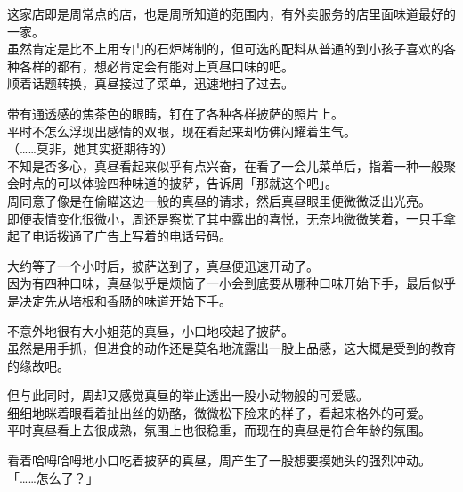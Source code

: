 这家店即是周常点的店，也是周所知道的范围内，有外卖服务的店里面味道最好的一家。\\

虽然肯定是比不上用专门的石炉烤制的，但可选的配料从普通的到小孩子喜欢的各种各样的都有，想必肯定会有能对上真昼口味的吧。\\

顺着话题转换，真昼接过了菜单，迅速地扫了过去。

带有通透感的焦茶色的眼睛，钉在了各种各样披萨的照片上。\\

平时不怎么浮现出感情的双眼，现在看起来却仿佛闪耀着生气。\\

（……莫非，她其实挺期待的）\\

不知是否多心，真昼看起来似乎有点兴奋，在看了一会儿菜单后，指着一种一般聚会时点的可以体验四种味道的披萨，告诉周「那就这个吧」。\\

周同意了像是在偷瞄这边一般的真昼的请求，然后真昼眼里便微微泛出光亮。\\

即便表情变化很微小，周还是察觉了其中露出的喜悦，无奈地微微笑着，一只手拿起了电话拨通了广告上写着的电话号码。\\

\vspace{2\baselineskip}

大约等了一个小时后，披萨送到了，真昼便迅速开动了。\\

因为有四种口味，真昼似乎是烦恼了一小会到底要从哪种口味开始下手，最后似乎是决定先从培根和香肠的味道开始下手。

不意外地很有大小姐范的真昼，小口地咬起了披萨。\\

虽然是用手抓，但进食的动作还是莫名地流露出一股上品感，这大概是受到的教育的缘故吧。

但与此同时，周却又感觉真昼的举止透出一股小动物般的可爱感。\\

细细地眯着眼看着扯出丝的奶酪，微微松下脸来的样子，看起来格外的可爱。\\

平时真昼看上去很成熟，氛围上也很稳重，而现在的真昼是符合年龄的氛围。

看着哈呣哈呣地小口吃着披萨的真昼，周产生了一股想要摸她头的强烈冲动。\\

「……怎么了？」

